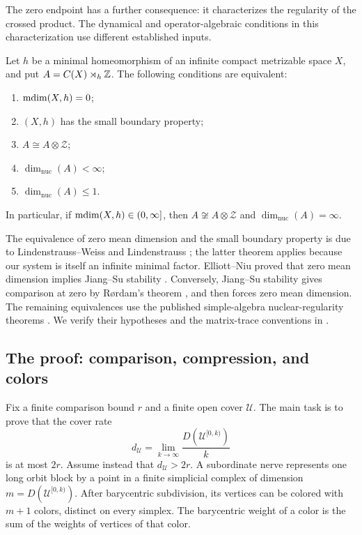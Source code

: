 The zero endpoint has a further consequence: it characterizes the
regularity of the crossed product. The dynamical and operator-algebraic
conditions in this characterization use different established inputs.

\begin{corollary}
\label{cor:regularity}
Let \(h\) be a minimal homeomorphism of an infinite compact metrizable
space \(X\), and put \(A=C(X)\rtimes_h\mathbb Z\). The following conditions are
equivalent:
\begin{enumerate}
\item \(\operatorname{mdim}(X,h)=0\);
\item \((X,h)\) has the small boundary property;
\item \(A\cong A\otimes\mathcal Z\);
\item \(\dim_{\mathrm{nuc}}(A)<\infty\);
\item \(\dim_{\mathrm{nuc}}(A)\le1\).
\end{enumerate}
In particular, if \(\operatorname{mdim}(X,h)\in(0,\infty]\), then
\(A\not\cong A\otimes\mathcal Z\) and
\(\dim_{\mathrm{nuc}}(A)=\infty\).
\end{corollary}

The equivalence of zero mean dimension and the small boundary property
is due to Lindenstrauss--Weiss and Lindenstrauss
\cite[Theorem~5.4]{LindenstraussWeiss2000}
\cite[Theorem~6.2]{Lindenstrauss1999}; the latter theorem applies because
our system is itself an infinite minimal factor.
Elliott--Niu proved that zero mean dimension implies Jiang--Su stability
\cite[Theorem~4.7]{ElliottNiu2017}. Conversely, Jiang--Su stability gives
comparison at zero by R\o rdam's theorem
\cite[Corollary~4.6]{Rordam2004}, and  then forces zero
mean dimension. The remaining equivalences use the published
simple-algebra nuclear-regularity theorems
\cite[Theorems~A and~B]{CastillejosEvingtonTikuisisWhiteWinter2021}.
We verify their hypotheses and the matrix-trace conventions in
.

\subsection{The proof: comparison, compression, and colors}

Fix a finite comparison bound $r$ and a finite open cover $\mathcal U$.
The main task is to prove that the cover rate
\[
 d_{\mathcal U}=\lim_{k\to\infty}
            \frac{D(\mathcal U^{[0,k)})}{k}
\]
is at most $2r$. Assume instead that $d_{\mathcal U}>2r$.
A subordinate nerve represents one long orbit block by a point in a
finite simplicial complex of dimension $m=D(\mathcal U^{[0,k)})$.
After barycentric subdivision, its vertices can be colored with $m+1$
colors, distinct on every simplex. The barycentric weight of a color
is the sum of the weights of vertices of that color.

